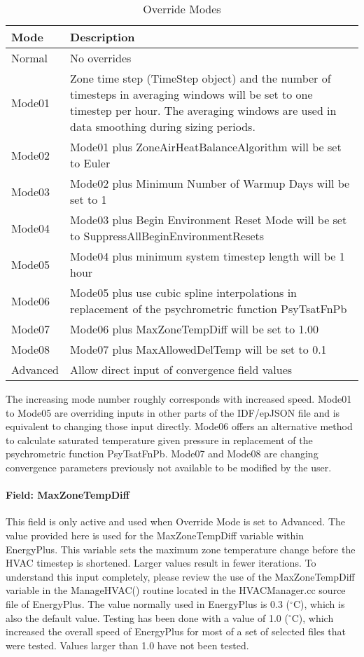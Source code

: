 \begin{longtable}[c]{p{1.5in}p{5.0in}}
    \caption{Override Modes\label{table:override_modes}} \tabularnewline
    \toprule
    Mode & Description \tabularnewline
    \midrule
    \endfirsthead

    Normal & No overrides\tabularnewline
    Mode01 & Zone time step (TimeStep object) and the number of timesteps in averaging windows
    will be set to one timestep per hour. The averaging windows are used in data smoothing
    during sizing periods.\tabularnewline
    Mode02 & Mode01 plus ZoneAirHeatBalanceAlgorithm will be set to Euler\tabularnewline
    Mode03 & Mode02 plus Minimum Number of Warmup Days will be set to 1\tabularnewline
    Mode04 & Mode03 plus Begin Environment Reset Mode will be set to SuppressAllBeginEnvironmentResets\tabularnewline
    Mode05 & Mode04 plus minimum system timestep length will be 1 hour\tabularnewline
    Mode06 & Mode05 plus use cubic spline interpolations in replacement of the psychrometric function PsyTsatFnPb\tabularnewline
    Mode07 & Mode06 plus MaxZoneTempDiff will be set to 1.00\tabularnewline
    Mode08 & Mode07 plus MaxAllowedDelTemp will be set to 0.1\tabularnewline
    Advanced& Allow direct input of convergence field values\tabularnewline

    \bottomrule
\end{longtable}

The increasing mode number roughly corresponds with increased speed. Mode01 to Mode05 are overriding inputs in other parts of the IDF/epJSON file and is equivalent to changing those input directly. Mode06 offers an alternative method to calculate saturated temperature given pressure in replacement of the psychrometric function PsyTsatFnPb. Mode07 and Mode08 are changing convergence parameters previously not available to be modified by the user.

\paragraph{Field: MaxZoneTempDiff}\label{max-zone-temp-diff}

This field is only active and used when Override Mode is set to Advanced. The value provided here is used for the MaxZoneTempDiff variable within EnergyPlus. This variable sets the maximum zone temperature change before the HVAC timestep is shortened. Larger values result in fewer iterations. To understand this input completely, please review the use of the MaxZoneTempDiff variable in the ManageHVAC() routine located in the HVACManager.cc source file of EnergyPlus. The value normally used in EnergyPlus is 0.3 ($^\circ$C), which is also the default value. Testing has been done with a value of 1.0 ($^\circ$C), which increased the overall speed of EnergyPlus for most of a set of selected files that were tested. Values larger than 1.0 have not been tested.

